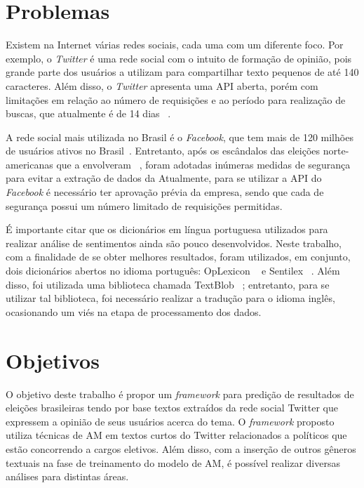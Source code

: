 %

\section{Problemas}

Existem na Internet várias redes sociais, cada uma com um diferente foco. Por exemplo, o \textit{Twitter} é uma rede social com o intuito de formação de opinião, 
pois grande parte dos usuários a utilizam para compartilhar texto pequenos de até 140 caracteres. Além disso, o \textit{Twitter} apresenta uma API aberta, 
porém com limitações em relação ao número de requisições e ao período para realização de buscas, que atualmente é de 14 dias ~\cite{Twitter}.

A rede social mais utilizada no Brasil é o \textit{Facebook}, que tem mais de 120 milhões de usuários ativos no Brasil~\cite{EBC}.  Entretanto, após os escândalos das eleições norte-americanas que a 
envolveram ~\cite{face}, foram adotadas inúmeras medidas de segurança para evitar a extração de dados da Atualmente, para se utilizar a \acrshort{API} do \textit{Facebook} é 
necessário ter aprovação prévia da empresa, sendo que cada  de segurança possui um número limitado de requisições permitidas.

É importante citar que os dicionários em língua portuguesa utilizados para realizar análise de sentimentos ainda são pouco desenvolvidos. 
Neste trabalho, com a finalidade de se obter melhores resultados, foram utilizados, em conjunto, dois dicionários abertos no idioma 
português: OpLexicon ~\cite{souza} e Sentilex ~\cite{Neuenschwander}. Além disso, foi utilizada uma biblioteca chamada TextBlob  ~\cite{textblob}; entretanto, para se utilizar tal biblioteca, 
foi necessário realizar a tradução para o idioma inglês, ocasionando um viés na etapa de processamento dos dados.

\section{Objetivos}


O objetivo deste trabalho é propor um \textit{framework} para predição de resultados de eleições brasileiras tendo por base textos extraídos da rede social Twitter 
que expressem a opinião de seus usuários acerca do tema. O \textit{framework} proposto utiliza técnicas de \acrshort{AM} em textos curtos do Twitter relacionados a políticos 
que estão concorrendo a cargos eletivos. 
Além disso, com a inserção de outros gêneros textuais na fase de treinamento do modelo de \acrshort{AM}, é possível realizar diversas análises para distintas áreas.


